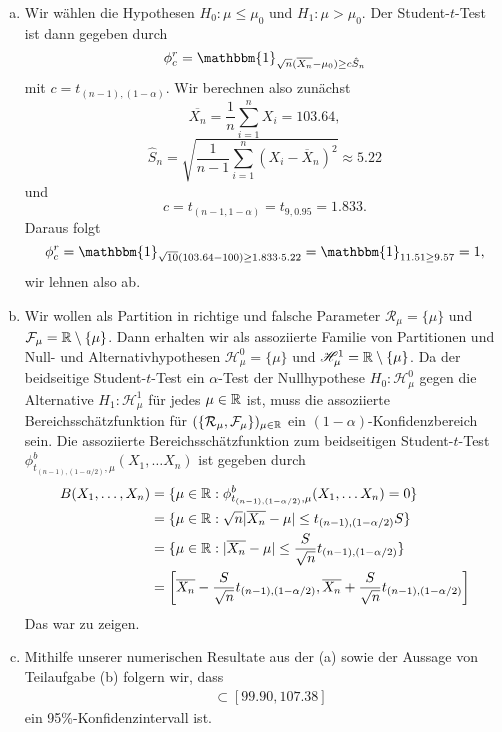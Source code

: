 \documentclass[uebung]{lecture}
\begin{document}
\begin{aufgabe}
    \begin{enumerate}[(a)]
        \item Wir wählen die Hypothesen $H_0 \colon \mu \leq \mu_0$ und $H_1 \colon \mu > \mu_0$. 
        Der Student-$t$-Test ist dann gegeben durch
        \[
            \phi_c^r = \mathbbm{1}_{\sqrt{n}(\overline{X_n} - \mu_0) \geq c \hat{S}_n}  
        \]
        mit $ c= t_{(n-1), (1-\alpha)}$.
        Wir berechnen also zunächst
        \[
            \overline{X_n} = \frac{1}{n}\sum_{i = 1}^{n} X_i = 103.64,
        \]
        \[
            \hat{S}_n = \sqrt{\frac{1}{n-1} \sum_{i = 1}^{n} (X_i - \overline{X}_n)^2} \approx 5.22
        \]
        und
        \[
            c = t_{(n-1, 1-\alpha)} = t_{9, 0.95} = 1.833.  
        \]
        Daraus folgt
        \[
            \phi_c^r = \mathbbm{1}_{\sqrt{10}(103.64-100) \geq 1.833 \cdot 5.22} = \mathbbm{1}_{11.51 \geq 9.57} = 1,
        \]
        wir lehnen also ab.
        \item Wir wollen als Partition in richtige und falsche Parameter $\mathcal{R}_\mu = \{\mu\}$ und $\mathcal{F}_\mu = \mathbb{R}\setminus\{\mu\}$.
        Dann erhalten wir als assoziierte Familie von Partitionen und Null- und Alternativhypothesen
        $\mathscr H_\mu^0 = \{\mu\}$ und $\mathscr H_\mu^1 = \mathbb{R} \setminus \{\mu\}$.
        Da der beidseitige Student-$t$-Test ein $\alpha$-Test der Nullhypothese $H_0\colon \mathscr H_\mu^0$ gegen die 
        Alternative $H_1 \colon \mathscr H_\mu^1$ für jedes $\mu \in \mathbb{R}$ ist, muss die assoziierte Bereichsschätzfunktion
        für $(\{\mathcal R_\mu, \mathcal F_\mu\})_{\mu \in \mathbb{R}}$ ein $(1-\alpha)$-Konfidenzbereich sein.
        Die assoziierte Bereichsschätzfunktion zum beidseitigen Student-$t$-Test 
        $\phi^b_{t_{(n-1), (1 - \alpha/2)}, \mu}(X_1, \dots X_n)$ ist gegeben durch
        \begin{align*}
            B(X_1, \dots, X_n) &= \{\mu \in \mathbb{R}: \phi^b_{t_{(n-1), (1 - \alpha/2)}, \mu}(X_1, \dots X_n) = 0\}\\
            &= \{\mu \in \mathbb{R}: \sqrt{n}|\overline{X_n} - \mu| \leq t_{(n-1), (1-\alpha/2)} S\}\\
            &= \{\mu \in \mathbb{R}: |\overline{X_n} - \mu| \leq \frac{S}{\sqrt{n}} t_{(n-1), (1-\alpha/2)}\}\\
            &= \left[\overline{X_n} - \frac{S}{\sqrt{n}} t_{(n-1), (1-\alpha/2)}, \overline{X_n} + \frac{S}{\sqrt{n}} t_{(n-1), (1-\alpha/2)}\right]
        \end{align*}
        Das war zu zeigen.
        \item Mithilfe unserer numerischen Resultate aus der (a) sowie der Aussage von Teilaufgabe (b) folgern wir, dass
        \begin{align*}
            [103.64 - \frac{5.22}{\sqrt{10}}t_{9, 0.975}, 103.64 + \frac{5.22}{\sqrt{10}}t_{9, 0.975}] &\subset [99.90, 107.38]
        \end{align*}
        ein 95\%-Konfidenzintervall ist.
    \end{enumerate}
\end{aufgabe}
\end{document}
